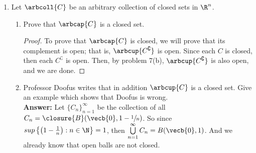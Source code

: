 \documentclass[a5paper]{article}
\theoremstyle{definition}%
\numberwithin{exercise}{section}
\theoremstyle{remark}%
\begin{document}
\begin{enumerate}
\item Let $\arbcoll{C}$ be an arbitrary collection of closed sets in $\R^n$. 
	\begin{enumerate}
	\item Prove that $\arbcap{C}$ is a closed set.
	\begin{proof} To prove that $\arbcap{C}$ is closed, we will prove that its complement is open; that is, $\arbcup{C^\complement}$ is open. Since each $C$ is closed, then each $C^\complement$ is open. Then, by problem 7(b), $\arbcup{C^\complement}$ is also open, and we are done. 
	
	\end{proof}
	
	\item Professor Doofus writes that in addition $\arbcup{C}$ is a closed set. Give an example which shows that Doofus is wrong. \\
	\textbf{Answer:} Let $\{C_n\}_{n=1}^\infty$ be the collection of all $C_n=\closure{B}(\vecb{0},1-\sfrac{1}{n})$. So since $sup\left\lbrace\left(1-\frac{1}{n}\right):n\in\N\right\rbrace=1$, then $\bigcup\limits_{n=1}^\infty C_n=B(\vecb{0},1)$. And we already know that open balls are not closed. 
	\end{enumerate}
\end{enumerate}

\pagebreak
\end{document}
